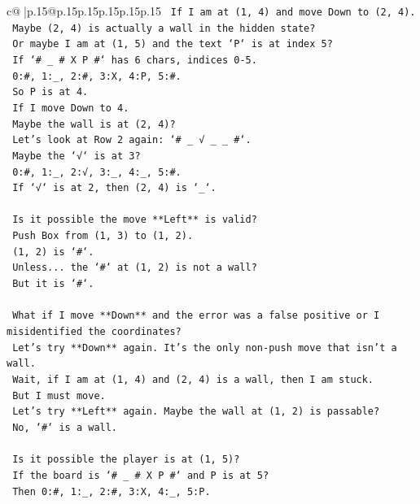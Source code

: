 \documentclass{article}
\begin{document}
{\begin{supertabular}{c@{$\;$}|p{.15\linewidth}@{}p{.15\linewidth}p{.15\linewidth}p{.15\linewidth}p{.15\linewidth}p{.15\linewidth}}
{{{\texttt{      If I am at (1, 4) and move Down to (2, 4).} \\
\texttt{      Maybe (2, 4) is actually a wall in the hidden state?} \\
\texttt{      Or maybe I am at (1, 5) and the text `P` is at index 5?} \\
\texttt{      If `\# \_ \# X P \#` has 6 chars, indices 0{-}5.} \\
\texttt{      0:\#, 1:\_, 2:\#, 3:X, 4:P, 5:\#.} \\
\texttt{      So P is at 4.} \\
\texttt{      If I move Down to 4.} \\
\texttt{      Maybe the wall is at (2, 4)?} \\
\texttt{      Let's look at Row 2 again: `\# \_ √ \_ \_ \#`.} \\
\texttt{      Maybe the `√` is at 3?} \\
\texttt{      0:\#, 1:\_, 2:√, 3:\_, 4:\_, 5:\#.} \\
\texttt{      If `√` is at 2, then (2, 4) is `\_`.} \\
\\ 
\texttt{      Is it possible the move **Left** is valid?} \\
\texttt{      Push Box from (1, 3) to (1, 2).} \\
\texttt{      (1, 2) is `\#`.} \\
\texttt{      Unless... the `\#` at (1, 2) is not a wall?} \\
\texttt{      But it is `\#`.} \\
\\ 
\texttt{      What if I move **Down** and the error was a false positive or I misidentified the coordinates?} \\
\texttt{      Let's try **Down** again. It's the only non{-}push move that isn't a wall.} \\
\texttt{      Wait, if I am at (1, 4) and (2, 4) is a wall, then I am stuck.} \\
\texttt{      But I must move.} \\
\texttt{      Let's try **Left** again. Maybe the wall at (1, 2) is passable?} \\
\texttt{      No, `\#` is a wall.} \\
\\ 
\texttt{      Is it possible the player is at (1, 5)?} \\
\texttt{      If the board is `\# \_ \# X P \#` and P is at 5?} \\
\texttt{      Then 0:\#, 1:\_, 2:\#, 3:X, 4:\_, 5:P.} \\
}}}
\end{supertabular}}
\end{document}
